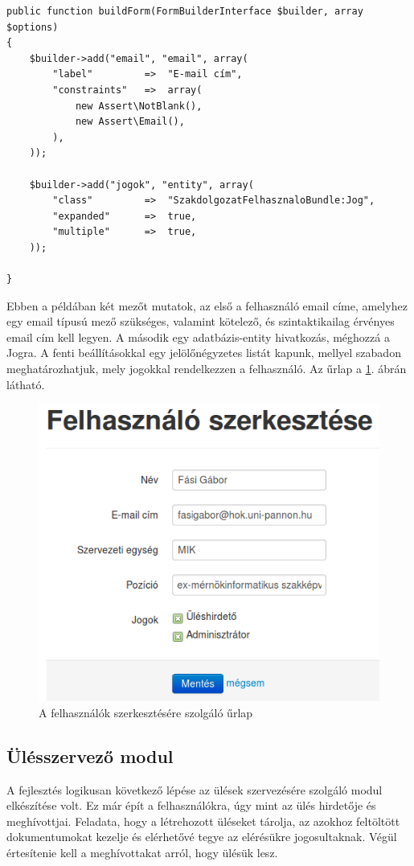 \documentclass[a4paper,12pt,oneside]{report}
\begin{document}
\begin{lstlisting}
public function buildForm(FormBuilderInterface $builder, array $options)
{
    $builder->add("email", "email", array(
        "label"         =>  "E-mail cím",
        "constraints"   =>  array(
            new Assert\NotBlank(),
            new Assert\Email(),
        ),
    ));

    $builder->add("jogok", "entity", array(
        "class"         =>  "SzakdolgozatFelhasznaloBundle:Jog",
        "expanded"      =>  true,
        "multiple"      =>  true,
    ));

}
\end{lstlisting}

Ebben a példában két mezőt mutatok, az első a felhasználó email címe, amelyhez egy email típusú mező szükséges, valamint kötelező, és szintaktikailag érvényes email cím kell legyen. A második egy adatbázis-entity hivatkozás, méghozzá a Jogra. A fenti beállításokkal egy jelölőnégyzetes listát kapunk, mellyel szabadon meghatározhatjuk, mely jogokkal rendelkezzen a felhasználó. Az űrlap a \ref{fig:felhasznalo_szerkesztes}. ábrán látható.

\begin{figure}[h]
    \centering
    \includegraphics[width=.65\textwidth]{felhasznalo_szerkesztes.png}
    \caption{A felhasználók szerkesztésére szolgáló űrlap}
    \label{fig:felhasznalo_szerkesztes}
\end{figure}

\subsection{Ülésszervező modul}

A fejlesztés logikusan következő lépése az ülések szervezésére szolgáló modul elkészítése volt. Ez már épít a felhasználókra, úgy mint az ülés hirdetője és meghívottjai. Feladata, hogy a létrehozott üléseket tárolja, az azokhoz feltöltött dokumentumokat kezelje és elérhetővé tegye az elérésükre jogosultaknak. Végül értesítenie kell a meghívottakat arról, hogy ülésük lesz.
\end{document}
